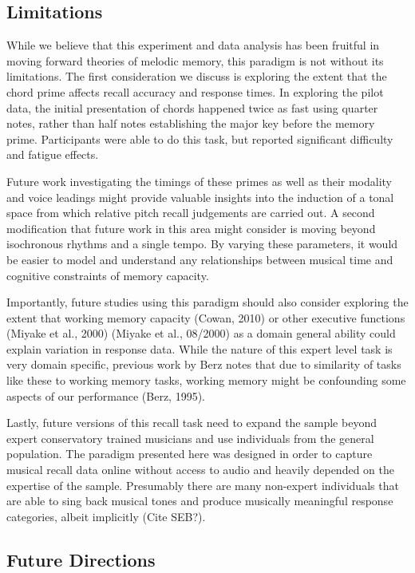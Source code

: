 \documentclass[english,man]{apa6}
\begin{document}
\hypertarget{limitations}{%
\subsection{Limitations}\label{limitations}}

While we believe that this experiment and data analysis has been fruitful in moving forward theories of melodic memory, this paradigm is not without its limitations.
The first consideration we discuss is exploring the extent that the chord prime affects recall accuracy and response times.
In exploring the pilot data, the initial presentation of chords happened twice as fast using quarter notes, rather than half notes establishing the major key before the memory prime.
Participants were able to do this task, but reported significant difficulty and fatigue effects.

Future work investigating the timings of these primes as well as their modality and voice leadings might provide valuable insights into the induction of a tonal space from which relative pitch recall judgements are carried out.
A second modification that future work in this area might consider is moving beyond isochronous rhythms and a single tempo.
By varying these parameters, it would be easier to model and understand any relationships between musical time and cognitive constraints of memory capacity.

Importantly, future studies using this paradigm should also consider exploring the extent that working memory capacity (Cowan, 2010) or other executive functions (Miyake et al., 2000) (Miyake et al., 08/2000) as a domain general ability could explain variation in response data.
While the nature of this expert level task is very domain specific, previous work by Berz notes that due to similarity of tasks like these to working memory tasks, working memory might be confounding some aspects of our performance (Berz, 1995).

Lastly, future versions of this recall task need to expand the sample beyond expert conservatory trained musicians and use individuals from the general population.
The paradigm presented here was designed in order to capture musical recall data online without access to audio and heavily depended on the expertise of the sample.
Presumably there are many non-expert individuals that are able to sing back musical tones and produce musically meaningful response categories, albeit implicitly (Cite SEB?).

\hypertarget{future-directions}{%
\subsection{Future Directions}\label{future-directions}}
\end{document}
